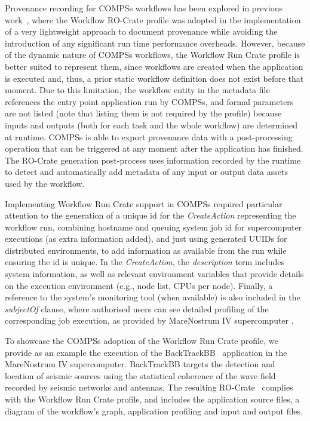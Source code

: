 Provenance recording for COMPSs workflows has been explored in previous work~\cite{Sirvent 2022}, where the Workflow RO-Crate profile was adopted in the implementation of a very lightweight approach to document provenance while avoiding the introduction of any significant run time performance overheads.
However, because of the dynamic nature of COMPSs workflows, the Workflow Run Crate profile is better suited to represent them, since workflows are created when the application is executed and, thus, a prior static workflow definition does not exist before that moment.
Due to this limitation, the workflow entity in the metadata file references the entry point application run by COMPSs, and formal parameters are not listed (note that listing them is not required by the profile) because inputs and outputs (both for each task and the whole workflow) are determined at runtime.
COMPSs is able to export provenance data with a post-processing operation that can be triggered at any moment after the application has finished.
The RO-Crate generation post-process uses information recorded by the runtime to detect and automatically add metadata of any input or output data assets used by the workflow.

Implementing Workflow Run Crate support in COMPSs required particular attention to the generation of a unique id for the \emph{CreateAction} representing the workflow run, combining hostname and queuing system job id for supercomputer executions (as extra information added), and just using generated UUIDs for distributed environments, to add information as available from the run while ensuring the id is unique.
In the \emph{CreateAction}, the \emph{description} term includes system information, as well as relevant environment variables that provide details on the execution environment (e.g., node list, CPUs per node).
Finally, a reference to the system's monitoring tool (when available) is also included in the \emph{subjectOf} clause, where authorised users can see detailed profiling of the corresponding job execution, as provided by MareNostrum IV supercomputer .

To showcase the COMPSs adoption of the Workflow Run Crate profile, we provide as an example the execution of the BackTrackBB~\cite{Poiata 2016}
application in the MareNostrum IV supercomputer.
BackTrackBB targets the detection and location of seismic sources using the statistical coherence of the wave field recorded by seismic networks and antennas.
The resulting RO-Crate~\cite{Poiata 2023} complies with the Workflow Run Crate profile, and includes the application source files, a diagram of the workflow's graph, application profiling and input and output files.

